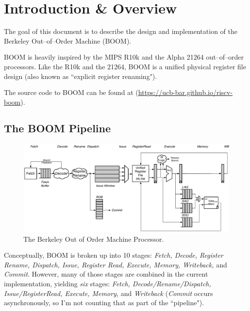 
\chapter{Introduction \& Overview}
\label{sec:introduction}

The goal of this document is to describe the design and implementation of the Berkeley Out--of--Order Machine (BOOM). 


 BOOM is heavily inspired by the MIPS R10k and the Alpha 21264 out--of--order processors\cite{alpha21264, mipsr10k}.  Like the R10k and the 21264, BOOM is a unified physical register file design (also known as ``explicit register renaming"). 
 
 The source code to BOOM can be found at (\url{https://ucb-bar.github.io/riscv-boom}).

\section{The BOOM Pipeline}


\begin{figure}[ht]
	\centering
	\centerline{\includegraphics[scale =.9] {figures/boom_stages}}
	\caption{ \small The Berkeley Out of Order Machine Processor.}
	\label{fig:rv32_boom}
\end{figure}



Conceptually, BOOM is broken up into 10 stages: {\em Fetch, Decode, Register Rename, Dispatch, Issue, Register Read, Execute, Memory, Writeback,} and {\em Commit}.  However, many of those stages are combined in the current implementation, yielding {\em six} stages: {\em Fetch, Decode/Rename/Dispatch, Issue/RegisterRead, Execute, Memory,} and {\em Writeback} ({\em Commit} occurs asynchronously, so I'm not counting that as part of the ``pipeline").   

